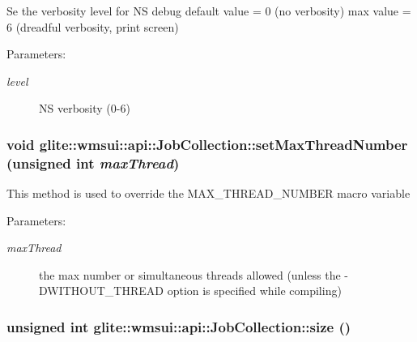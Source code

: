 Se the verbosity level for NS debug default value = 0 (no verbosity) max value = 6 (dreadful verbosity, print screen) \begin{Desc}
\item[Parameters:]
\begin{description}
\item[{\em level}]NS verbosity (0-6)\end{description}
\end{Desc}
\hypertarget{classglite_1_1wmsui_1_1api_1_1JobCollection_z3_8}{
\subsubsection[setMaxThreadNumber]{\setlength{\rightskip}{0pt plus 5cm}void glite::wmsui::api::Job\-Collection::set\-Max\-Thread\-Number (unsigned int {\em max\-Thread})}}
\label{classglite_1_1wmsui_1_1api_1_1JobCollection_z3_8}


This method is used to override the MAX\_\-THREAD\_\-NUMBER macro variable \begin{Desc}
\item[Parameters:]
\begin{description}
\item[{\em max\-Thread}]the max number or simultaneous threads allowed (unless the -DWITHOUT\_\-THREAD option is specified while compiling) \end{description}
\end{Desc}
\hypertarget{classglite_1_1wmsui_1_1api_1_1JobCollection_z3_1}{
\subsubsection[size]{\setlength{\rightskip}{0pt plus 5cm}unsigned int glite::wmsui::api::Job\-Collection::size ()}}
\label{classglite_1_1wmsui_1_1api_1_1JobCollection_z3_1}



